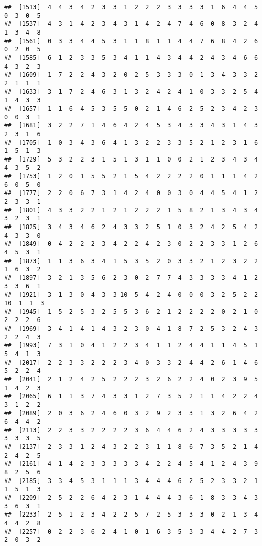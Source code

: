 \documentclass[
]{article}
\begin{document}
\begin{verbatim}
##  [1513]  4  4  3  4  2  3  3  1  2  2  2  3  3  3  3  1  6  4  4  5  0  3  0  5
##  [1537]  4  3  1  4  2  3  4  3  1  4  2  4  7  4  6  0  8  3  2  4  1  3  4  8
##  [1561]  0  3  3  4  4  5  3  1  1  8  1  1  4  4  7  6  8  4  2  6  0  2  0  5
##  [1585]  6  1  2  3  3  5  3  4  1  1  4  3  4  4  2  4  3  4  6  6  4  3  2  3
##  [1609]  1  7  2  2  4  3  2  0  2  5  3  3  3  0  1  3  4  3  3  2  2  1  1  1
##  [1633]  3  1  7  2  4  6  3  1  3  2  4  2  4  1  0  3  3  2  5  4  1  4  3  3
##  [1657]  1  1  6  4  5  3  5  5  0  2  1  4  6  2  5  2  3  4  2  3  0  0  3  1
##  [1681]  3  2  2  7  1  4  6  4  2  4  5  3  4  3  3  4  3  1  4  3  2  3  1  6
##  [1705]  1  0  3  4  3  6  4  1  3  2  2  3  3  5  2  1  2  3  1  6  1  5  1  3
##  [1729]  5  3  2  2  3  1  5  1  3  1  1  0  0  2  1  2  3  4  3  4  4  3  5  2
##  [1753]  1  2  0  1  5  5  2  1  5  4  2  2  2  2  0  1  1  1  4  2  6  0  5  0
##  [1777]  2  2  0  6  7  3  1  4  2  4  0  0  3  0  4  4  5  4  1  2  2  3  3  1
##  [1801]  4  3  3  2  2  1  2  1  2  2  2  1  5  8  2  1  3  4  3  4  3  2  3  1
##  [1825]  3  4  3  4  6  2  4  3  3  2  5  1  0  3  2  4  2  5  4  2  4  3  3  0
##  [1849]  0  4  2  2  2  3  4  2  2  4  2  3  0  2  2  3  3  1  2  6  4  5  3  1
##  [1873]  1  1  3  6  3  4  1  5  3  5  2  0  3  3  2  1  2  3  2  2  1  6  3  2
##  [1897]  3  2  1  3  5  6  2  3  0  2  7  7  4  3  3  3  3  4  1  2  3  3  6  1
##  [1921]  3  1  3  0  4  3  3 10  5  4  2  4  0  0  0  3  2  5  2  2 10  1  1  3
##  [1945]  1  5  2  5  3  2  5  5  3  6  2  1  2  2  2  2  0  2  1  0  2  2  2  6
##  [1969]  3  4  1  4  1  4  3  2  3  0  4  1  8  7  2  5  3  2  4  3  2  2  4  3
##  [1993]  7  3  1  0  4  1  2  2  3  4  1  1  2  4  4  1  1  4  5  1  5  4  1  3
##  [2017]  2  2  3  3  2  2  2  3  4  0  3  3  2  4  4  2  6  1  4  6  5  2  2  4
##  [2041]  2  1  2  4  2  5  2  2  2  3  2  6  2  2  4  0  2  3  9  5  1  4  2  3
##  [2065]  6  1  1  3  7  4  3  3  1  2  7  3  5  2  1  1  4  2  2  4  3  1  2  2
##  [2089]  2  0  3  6  2  4  6  0  3  2  9  2  3  3  1  3  2  6  4  2  6  4  4  2
##  [2113]  2  2  3  3  2  2  2  2  3  6  4  4  6  2  4  3  3  3  3  3  3  3  3  5
##  [2137]  2  3  3  1  2  4  3  2  2  3  1  1  8  6  7  3  5  2  1  4  2  4  2  5
##  [2161]  4  1  4  2  3  3  3  3  3  4  2  2  4  5  4  1  2  4  3  9  8  2  5  6
##  [2185]  3  3  4  5  3  1  1  1  3  4  4  4  6  2  5  2  3  3  2  1  1  5  1  3
##  [2209]  2  5  2  2  6  4  2  3  1  4  4  4  3  6  1  8  3  3  4  3  3  6  3  1
##  [2233]  2  5  1  2  3  4  2  2  5  7  2  5  3  3  3  0  2  1  3  4  4  4  2  8
##  [2257]  0  2  2  3  6  2  4  1  0  1  6  3  5  3  3  4  4  2  7  3  2  0  3  2

\end{verbatim}
\end{document}
